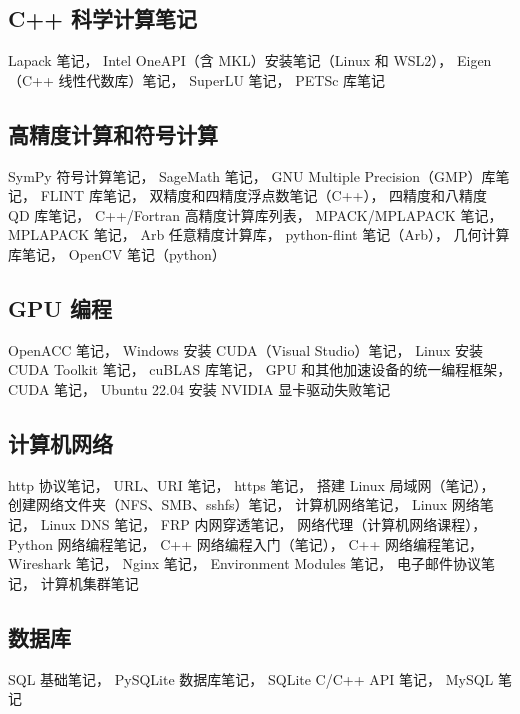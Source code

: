 \subsection{C++ 科学计算笔记}
Lapack 笔记，
Intel OneAPI（含 MKL）安装笔记（Linux 和 WSL2），
Eigen （C++ 线性代数库）笔记，
SuperLU 笔记，
PETSc 库笔记

\subsection{高精度计算和符号计算}
SymPy 符号计算笔记，
SageMath 笔记，
GNU Multiple Precision（GMP）库笔记，
FLINT 库笔记，
双精度和四精度浮点数笔记（C++），
四精度和八精度 QD 库笔记，
C++/Fortran 高精度计算库列表，
MPACK/MPLAPACK 笔记，
MPLAPACK 笔记，
Arb 任意精度计算库，
python-flint 笔记（Arb），
几何计算库笔记，
OpenCV 笔记（python）

\subsection{GPU 编程}
OpenACC 笔记，
Windows 安装 CUDA（Visual Studio）笔记，
Linux 安装 CUDA Toolkit 笔记，
cuBLAS 库笔记，
GPU 和其他加速设备的统一编程框架，
CUDA 笔记，
Ubuntu 22.04 安装 NVIDIA 显卡驱动失败笔记

\subsection{计算机网络}
http 协议笔记，
URL、URI 笔记，
https 笔记，
搭建 Linux 局域网（笔记），
创建网络文件夹（NFS、SMB、sshfs）笔记，
计算机网络笔记，
Linux 网络笔记，
Linux DNS 笔记，
FRP 内网穿透笔记，
网络代理（计算机网络课程），
Python 网络编程笔记，
C++ 网络编程入门（笔记），
C++ 网络编程笔记，
Wireshark 笔记，
Nginx 笔记，
Environment Modules 笔记，
电子邮件协议笔记，
计算机集群笔记

\subsection{数据库}
SQL 基础笔记，
PySQLite 数据库笔记，
SQLite C/C++ API 笔记，
MySQL 笔记

